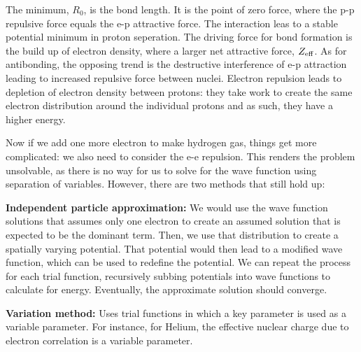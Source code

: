 \documentclass[11pt,fleqn]{book}
\begin{document}
The minimum, $R_0$, is the bond length. It is the point of zero force, where the p-p repulsive force equals the e-p attractive force. The interaction leas to a stable potential minimum in  proton seperation. The driving force for bond formation is the build up of electron density, where a larger net attractive force, $Z_{\rm eff}$. As for antibonding, the opposing trend is the destructive interference of e-p attraction leading to increased repulsive force between nuclei. Electron repulsion leads to depletion of electron density between protons: they take work to create the same electron distribution around the individual protons and as such, they have a higher energy.

Now if we add one more electron to make hydrogen gas, things get more complicated: we also need to consider the e-e repulsion. This renders the problem unsolvable, as there is no way for us to solve for the wave function using separation of variables. However, there are two methods that still hold up:

\textbf{Independent particle approximation: }We would use the wave function solutions that assumes only one electron to create an assumed solution that is expected to be the dominant term. Then, we use that distribution to create a spatially varying potential. That potential would then lead to a modified wave function, which can be used to redefine the potential. We can repeat the process for each trial function, recursively subbing potentials into wave functions to calculate for energy. Eventually, the approximate solution should converge.

\textbf{Variation method: }Uses trial functions in which a key parameter is used as a variable parameter. For instance, for Helium, the effective nuclear charge due to electron correlation is a variable parameter.








\end{document}
